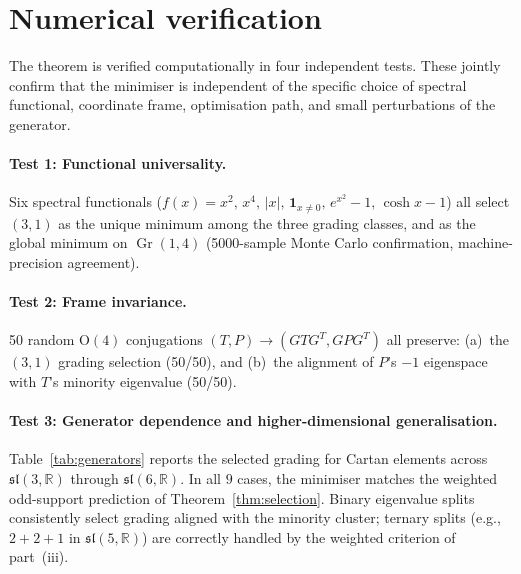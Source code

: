\documentclass[11pt]{article}
\theoremstyle{plain}
\theoremstyle{definition}
\theoremstyle{remark}
\newcommand{\sln}[1]{\mathfrak{sl}(#1,\mathbb{R})}
\newcommand{\Gr}{\operatorname{Gr}}
\begin{document}
\section{Numerical verification}
\label{sec:numerics}

The theorem is verified computationally in four independent tests.
These jointly confirm that the minimiser is independent of the
specific choice of spectral functional, coordinate frame,
optimisation path, and small perturbations of the generator.

\paragraph{Test 1: Functional universality.}
Six spectral functionals ($f(x) = x^2,\, x^4,\, |x|,\,
\mathbf{1}_{x \ne 0},\, e^{x^2}{-}1,\, \cosh x{-}1$) all select
$(3,1)$ as the unique minimum among the three grading
classes, and as the global minimum on $\Gr(1,4)$ (5000-sample
Monte Carlo confirmation, machine-precision agreement).

\paragraph{Test 2: Frame invariance.}
50 random $\mathrm{O}(4)$ conjugations
$(T, P) \to (GTG^T, GPG^T)$ all preserve: (a)~the $(3,1)$
grading selection (50/50), and (b)~the alignment of $P$'s $-1$
eigenspace with $T$'s minority eigenvalue (50/50).

\paragraph{Test 3: Generator dependence and higher-dimensional generalisation.}
Table~\ref{tab:generators} reports the selected grading for
Cartan elements across $\sln{3}$ through $\sln{6}$.  In all $9$
cases, the minimiser matches the weighted odd-support prediction of
Theorem~\ref{thm:selection}.  Binary eigenvalue splits consistently
select grading aligned with the minority cluster; ternary splits
(e.g., $2{+}2{+}1$ in $\sln{5}$) are correctly handled by the
weighted criterion of part~(iii).
\end{document}

